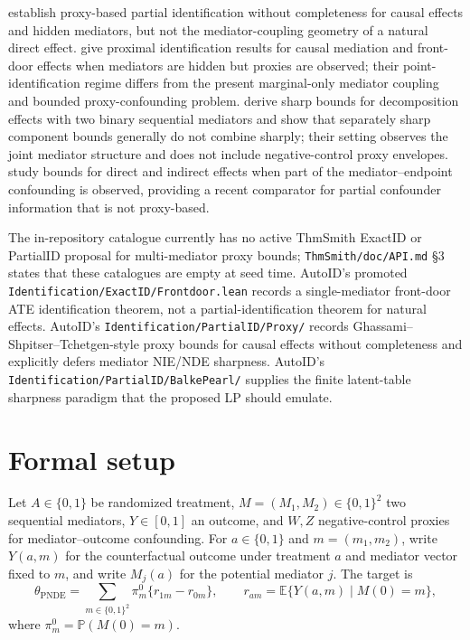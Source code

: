\documentclass[11pt]{article}
\newcommand{\E}{\mathbb{E}}
\renewcommand{\Pr}{\mathbb{P}}
\theoremstyle{definition}
\theoremstyle{plain}
\theoremstyle{remark}
\begin{document}
\citet{GhassamiShpitserTchetgen2023} establish proxy-based partial
identification without completeness for causal effects and hidden mediators,
but not the mediator-coupling geometry of a natural direct effect.
\citet{GhassamiYangShpitserTchetgen2025} give proximal identification results
for causal mediation and front-door effects when mediators are hidden but
proxies are observed; their point-identification regime differs from the
present marginal-only mediator coupling and bounded proxy-confounding problem.
\citet{GabrielSachsSjolander2023} derive sharp bounds for decomposition
effects with two binary sequential mediators and show that separately sharp
component bounds generally do not combine sharply; their setting observes the
joint mediator structure and does not include negative-control proxy envelopes.
\citet{HanLuoZhangGu2026} study bounds for direct and indirect effects when part of
the mediator--endpoint confounding is observed, providing a recent comparator
for partial confounder information that is not proxy-based.

The in-repository catalogue currently has no active ThmSmith ExactID or
PartialID proposal for multi-mediator proxy bounds; \texttt{ThmSmith/doc/API.md}
\S3 states that these catalogues are empty at seed time.  AutoID's promoted
\texttt{Identification/ExactID/Frontdoor.lean} records a single-mediator
front-door ATE identification theorem, not a partial-identification theorem for
natural effects.  AutoID's \texttt{Identification/PartialID/Proxy/} records
Ghassami--Shpitser--Tchetgen-style proxy bounds for causal effects without
completeness and explicitly defers mediator NIE/NDE sharpness.  AutoID's
\texttt{Identification/PartialID/BalkePearl/} supplies the finite latent-table
sharpness paradigm that the proposed LP should emulate.

\section{Formal setup}
Let \(A\in\{0,1\}\) be randomized treatment, \(M=(M_1,M_2)\in\{0,1\}^2\) two
sequential mediators, \(Y\in[0,1]\) an outcome, and \(W,Z\) negative-control
proxies for mediator--outcome confounding.  For \(a\in\{0,1\}\) and
\(m=(m_1,m_2)\), write \(Y(a,m)\) for the counterfactual outcome under
treatment \(a\) and mediator vector fixed to \(m\), and write \(M_j(a)\) for
the potential mediator \(j\).  The target is
\[
  \theta_{\mathrm{PNDE}}
  =\sum_{m\in\{0,1\}^2}\pi^0_m\{r_{1m}-r_{0m}\},
  \qquad
  r_{am}=\E\{Y(a,m)\mid M(0)=m\},
\]
where \(\pi^0_m=\Pr(M(0)=m)\).
\end{document}
